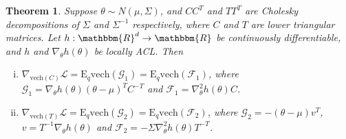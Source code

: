 \documentclass{statsoc}
\newtheorem{theorem}{Theorem}
\newcommand\E{{\text{E}}}
\newcommand\mL{{\mathcal{L}}}
\newcommand\G{{\mathcal{G}}}
\newcommand\F{{\mathcal{F}}}
\newcommand{\vech}{\text{vech}}
\begin{document}
\begin{theorem} \label{thm stein}
Suppose $\theta \sim N(\mu, \Sigma)$, and $CC^T$ and $TT^T$ are Cholesky decompositions of $\Sigma$ and $\Sigma^{-1}$ respectively, where $C$ and $T$ are lower triangular matrices. Let $h: \mathbbm{R}^d \rightarrow \mathbbm{R}$ be continuously differentiable,  and $h$ and $\nabla_\theta h(\theta)$ be locally ACL. Then
\begin{enumerate} [(i)]
\item $\nabla_{\vech(C)} \mL = \E_q \vech(\G_1) =  \E_q \vech(\F_1)$, where $\G_1 =  \nabla_\theta h(\theta) (\theta-\mu)^T C^{-T} $ and $\F_1 = \nabla_\theta^2 h(\theta) C$.
\item $\nabla_{\vech(T)}  \mL = \E_q \vech(\G_2) = \E_q   \vech(\F_2)$, where  $\G_2 = - (\theta - \mu) v^T$, $v = T^{-1} \nabla_\theta h(\theta)$ and $\F_2 = -\Sigma \nabla_\theta^2 h(\theta) T^{-T}$. 
\end{enumerate} 
\end{theorem}
\end{document}
